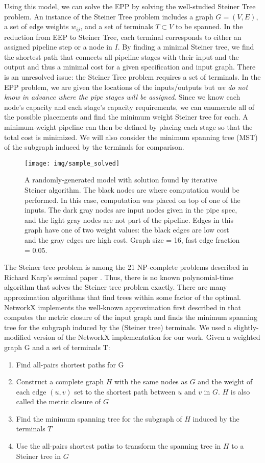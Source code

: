 \documentclass[conference]{IEEEtran}
\begin{document}
	Using this model, we can solve the EPP by solving the well-studied Steiner Tree problem. An instance of the Steiner Tree problem includes a graph $G = (V,E)$, a set of edge weights $w_{ij}$, and a set of terminals $T \subset V$ to be spanned. In the reduction from EEP to Steiner Tree, each terminal corresponds to either an assigned pipeline step or a node in $I$. By finding a minimal Steiner tree, we find the shortest path that connects all pipeline stages with their input and the output and thus a minimal cost for a given specification and input graph. There is an unresolved issue: the Steiner Tree problem requires a set of terminals. In the EPP problem, we are given the locations of the inputs/outputs but \textit{we do not know in advance where the pipe stages will be assigned}. Since we know each node's capacity and each stage's capacity requirements, we can enumerate all of the possible placements and find the minimum weight Steiner tree for each. A minimum-weight pipeline can then be defined by placing each stage so that the total cost is minimized. We will also consider the minimum spanning tree (MST) of the subgraph induced by the terminals for comparison.
	\begin{figure}
	    \centering
	    \texttt{[image: img/sample\_solved]}
	    \caption{A randomly-generated model with solution found by iterative Steiner algorithm. The black nodes are where computation would be performed. In this case, computation was placed on top of one of the inputs. The dark gray nodes are input nodes given in the pipe spec, and the light gray nodes are not part of the pipeline. Edges in this graph have one of two weight values: the black edges are low cost and the gray edges are high cost. Graph size = 16, fast edge fraction = 0.05. }
	    \label{fig:my_label}
	\end{figure}
	The Steiner tree problem is among the 21 NP-complete problems described in Richard Karp's seminal paper \cite{Karp1972ReducibilityAC}. Thus, there is no known polynomial-time algorithm that solves the Steiner tree problem exactly. There are many approximation algorithms that find trees within some factor of the optimal. NetworkX implements the well-known approximation first described in \cite{Kou1981} that computes the metric closure of the input graph and finds the minimum spanning tree  for the subgraph induced by the (Steiner tree) terminals. We used a slightly-modified version of the NetworkX implementation for our work. Given a weighted graph G and a set of terminals T:
	\begin{enumerate}
	    \item Find all-pairs shortest paths for G
	    \item Construct a complete graph $H$ with the same nodes as $G$ and the weight of each edge $(u,v)$ set to the shortest path between $u$ and $v$ in $G$. $H$ is also called the metric closure of $G$
	    \item Find the minimum spanning tree for the subgraph of $H$ induced by the terminals $T$
	    \item Use the all-pairs shortest paths to transform the spanning tree in $H$ to a Steiner tree in $G$
	\end{enumerate}
\end{document}
